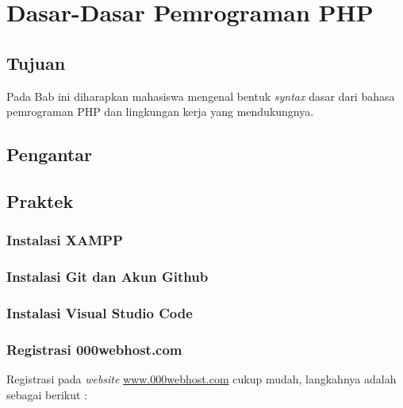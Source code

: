 \chapter{Dasar-Dasar Pemrograman PHP}

\section{Tujuan}

Pada Bab ini diharapkan mahasiswa mengenal bentuk \textit{syntax} dasar dari bahasa pemrograman PHP dan lingkungan kerja yang mendukungnya.

\section{Pengantar}



\section{Praktek}

\subsection{Instalasi XAMPP}



\subsection{Instalasi Git dan Akun Github}



\subsection{Instalasi Visual Studio Code}

\subsection{Registrasi 000webhost.com}

Registrasi pada \textit{website} \url{www.000webhost.com} cukup mudah, langkahnya adalah sebagai berikut :

